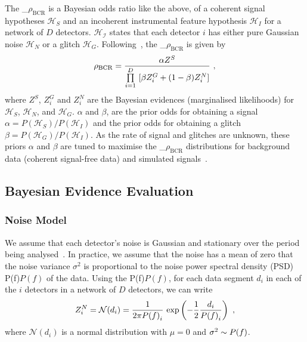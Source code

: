 \documentclass[%
 nofootinbib,
 amsmath,amssymb,
 aps,
 twocolumn
]{revtex4-2}
\newcommand{\mathcmd}[1]{{\sc \relax\ifmmode#1\else $#1$\fi}\xspace}
\newcommand{\bcr}{\mathcmd{\rho_\text{BCR}}}
\newcommand{\psd}{\mathcmd{P(f)}}
\begin{document}
The \bcr is a Bayesian odds ratio like the above, of a coherent signal hypotheses $\mathcal{H}_S$ and an incoherent instrumental feature hypothesis $\mathcal{H}_I$ for a network of $D$ detectors. $\mathcal{H_I}$ states that each detector $i$ has either pure Gaussian noise $\mathcal{H}_N$ or a glitch $\mathcal{H}_G$. Following~\citet{BCR1}, the \bcr is given by
\begin{equation}
\label{eq:bcr}
\bcr = \frac{\alpha Z^S}{\prod\limits^D_{i=1} \ [\beta Z^G_i + (1-\beta)Z^N_i]}\ ,
\end{equation}
where $Z^S$, $Z^G_i$ and $Z^N_i$ are the Bayesian evidences (marginalised likelihoods) for $\mathcal{H}_S$, $\mathcal{H}_N$, and $\mathcal{H}_G$. $\alpha$ and $\beta$, are the prior odds for obtaining a signal $\alpha=P(\mathcal{H}_S)/P(\mathcal{H}_I)$ and the prior odds for obtaining a glitch $\beta=P(\mathcal{H}_G)/P(\mathcal{H}_I)$. As the rate of signal and glitches are unknown, these priors $\alpha$ and $\beta$ are tuned to maximise the \bcr distributions for background data (coherent signal-free data) and simulated signals~\cite{BCR1}.  

\subsection{Bayesian Evidence Evaluation}
\subsubsection{Noise Model}
We assume that each detector's noise is Gaussian and stationary over the period being analysed~\cite{ligo_psd}. In practice, we assume that the noise has a mean of zero that the noise variance $\sigma^2$ is proportional to the noise power spectral density (PSD) \psd of the data. Using the \psd, for each data segment $d_i$ in each of the $i$ detectors in a network of $D$ detectors, we can write 
\begin{equation}
\label{eq:zn}
Z^N_i = \mathcal{N}(d_i) = \frac{1}{2\pi \psd_i} \ \text{exp}\left(-\frac{1}{2} \frac{d_i}{\psd_i} \right) \ ,
\end{equation}
where $\mathcal{N}(d_i)$ is a normal distribution with $\mu=0$ and $\sigma^2\sim \psd$. 
\end{document}
